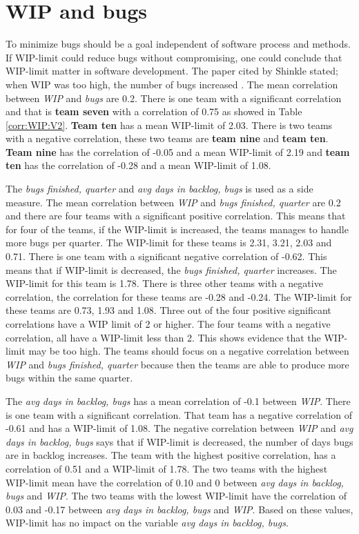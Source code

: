 \documentclass[UKenglish]{ifimaster}  %
\begin{document}
\section{WIP and bugs}
To minimize bugs should be a goal independent of software process and methods. If WIP-limit could reduce bugs without compromising, one could conclude that WIP-limit matter in software development. The paper cited by Shinkle stated; when WIP was too high, the number of bugs increased  \parencite{Shinkle}. The mean correlation between \textit{WIP} and \textit{bugs} are 0.2. There is one team with a significant correlation and that is \textbf{team seven}  with a correlation of 0.75 as showed in Table \ref{corr:WIP:V2}. \textbf{Team ten} has a mean WIP-limit of  2.03. There is two teams with a negative correlation, these two teams are \textbf{team nine} and \textbf{team ten}. \textbf{Team nine} has the correlation of -0.05  and a mean WIP-limit of 2.19 and \textbf{team ten} has the correlation of -0.28 and a mean WIP-limit of 1.08. 

The \textit{bugs finished, quarter} and  \textit{avg days in backlog, bugs} is used as a side measure. The mean correlation between \textit{WIP} and \textit{bugs finished, quarter} are 0.2 and there are four teams with a significant positive correlation. This means that for four of the teams, if the WIP-limit is increased, the teams manages to handle more bugs per quarter. The WIP-limit for these teams is  2.31, 3.21, 2.03 and 0.71. There is one team with a significant negative correlation of -0.62. This means that if WIP-limit is decreased, the \textit{bugs finished, quarter} increases.  The WIP-limit for this team is 1.78. There is three other teams with a negative correlation, the correlation for these teams are -0.28 and -0.24. The WIP-limit for these teams are 0.73, 1.93 and 1.08. Three out of the four positive significant correlations have a WIP limit of 2 or higher. The four teams with a negative correlation, all have a WIP-limit less than 2.  This shows evidence that the WIP-limit may be too high. The teams should focus on a negative correlation between \textit{WIP} and  \textit{bugs finished, quarter} because then the teams are able to produce more bugs within the same quarter. 

The \textit{avg days in backlog, bugs} has a mean correlation of -0.1 between \textit{WIP}. There is one team with a significant correlation. That team has a negative correlation of -0.61 and has a WIP-limit of 1.08. The negative correlation between \textit{WIP} and \textit{avg days in backlog, bugs} says that if WIP-limit is decreased, the number of days bugs are in backlog increases. The team with the highest positive correlation, has a correlation of 0.51 and a WIP-limit of 1.78. The two teams with the highest WIP-limit mean have the correlation of 0.10 and 0 between \textit{avg days in backlog, bugs}  and \textit{WIP}. The two teams with the lowest WIP-limit have the correlation of 0.03 and -0.17 between \textit{avg days in backlog, bugs}  and \textit{WIP}. Based on these values, WIP-limit has no impact on the variable \textit{avg days in backlog, bugs}. 
\end{document}
